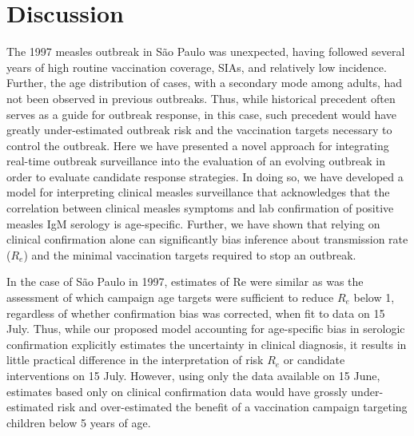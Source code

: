 \section{Discussion}\label{discussion}

The 1997 measles outbreak in S\~{a}o Paulo was unexpected, having followed several years of high routine vaccination coverage, SIAs, and relatively low incidence. Further, the age distribution of cases, with a secondary mode among adults, had not been observed in previous outbreaks. Thus, while historical precedent often serves as a guide for outbreak response, in this case, such precedent would have greatly under-estimated outbreak risk and the vaccination targets necessary to control the outbreak. Here we have presented a novel approach for integrating real-time outbreak surveillance into the evaluation of an evolving outbreak in order to evaluate candidate response strategies. In doing so, we have developed a model for interpreting clinical measles surveillance that acknowledges that the correlation between clinical measles symptoms and lab confirmation of positive measles IgM serology is age-specific. Further, we have shown that relying on clinical confirmation alone can significantly bias inference about transmission rate ($R_e$) and the minimal vaccination targets required to stop an outbreak.

In the case of S\~{a}o Paulo in 1997, estimates of Re were similar as was the assessment of which campaign age targets were sufficient to reduce $R_e$ below 1, regardless of whether confirmation bias was corrected, when fit to data on 15 July. Thus, while our proposed model accounting for age-specific bias in serologic confirmation explicitly estimates the uncertainty in clinical diagnosis, it results in little practical difference in the interpretation of risk $R_e$ or candidate interventions on 15 July. However, using only the data available on 15 June, estimates based only on clinical confirmation data would have grossly under-estimated risk and over-estimated the benefit of a vaccination campaign targeting children below 5 years of age. 

